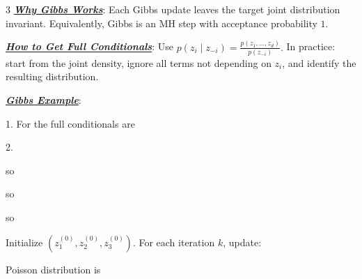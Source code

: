 \documentclass[12pt]{article}
\newcommand{\bulletPoint}[1]{\underline{\textit{\textbf{#1}}}}
\begin{document}
\begin{multicols*}{3}
\bulletPoint{Why Gibbs Works}:
Each Gibbs update leaves the target joint distribution invariant.
Equivalently, Gibbs is an MH step with acceptance probability $1.$

\bulletPoint{How to Get Full Conditionals}:
Use
$p(z_i\mid z_{-i})=\frac{p(z_1,\dots,z_d)}{p(z_{-i})}.$
In practice:
start from the joint density, ignore all terms not depending on $z_i$, and identify the resulting distribution.

\bulletPoint{Gibbs Example}:

1. For
the full conditionals are

2. 

so

so

so

Initialize \((z_1^{(0)},z_2^{(0)},z_3^{(0)})\). For each iteration \(k\), update:

Poisson distribution is




\end{multicols*}
\end{document}
